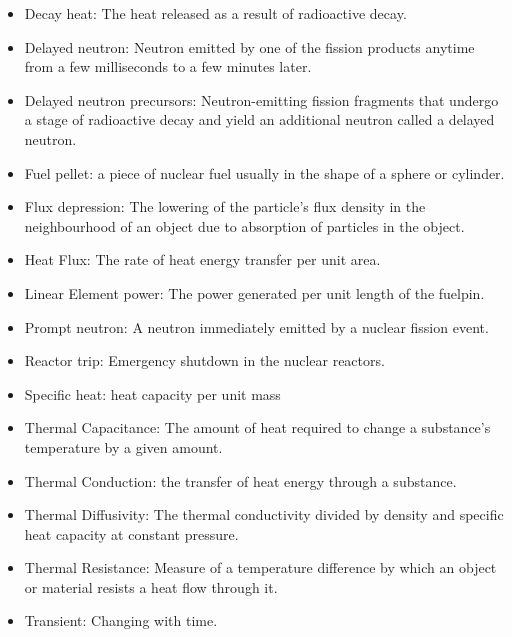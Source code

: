 \begin{itemize}

\item Decay heat: The heat released as a result of radioactive decay.

\item Delayed neutron: Neutron emitted by one of the fission products anytime
  from a few milliseconds to a few minutes later.

\item Delayed neutron precursors: Neutron-emitting fission fragments that
  undergo a stage of radioactive decay and yield an additional neutron called a
  delayed neutron.

\item Fuel pellet: a piece of nuclear fuel usually in the shape of a sphere or
  cylinder.

\item Flux depression: The lowering of the particle's flux density in the
  neighbourhood of an object due to absorption of particles in the object.

\item Heat Flux: The rate of heat energy transfer per unit area.

\item Linear Element power: The power generated per unit length of the fuelpin.

\item Prompt neutron: A neutron immediately emitted by a nuclear fission event.

\item Reactor trip: Emergency shutdown in the nuclear reactors.

\item Specific heat: heat capacity per unit mass

\item Thermal Capacitance: The amount of heat required to change a substance's
  temperature by a given amount.

\item Thermal Conduction: the transfer of heat energy through a substance.

\item Thermal Diffusivity: The thermal conductivity divided by density and
  specific heat capacity at constant pressure.

\item Thermal Resistance: Measure of a temperature difference by which an object
  or material resists a heat flow through it.

\item Transient: Changing with time.

\end{itemize}

